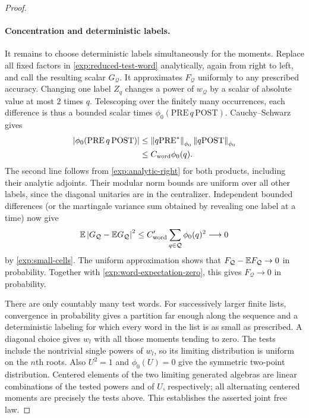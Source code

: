 \begin{proof}
\paragraph{Concentration and deterministic labels.}
It remains to choose deterministic labels simultaneously for the
moments. Replace all fixed factors in
\eqref{exp:reduced-test-word} analytically, again from right to left,
and call the resulting scalar $G_{\mathcal Q}$. It approximates
$F_{\mathcal Q}$ uniformly to any prescribed accuracy. Changing one
label $Z_q$ changes a power of $w_{\mathcal Q}$ by a scalar of
absolute value at most $2$ times $q$. Telescoping over the finitely
many occurrences, each difference is thus a bounded scalar times
$\phi_0(\mathrm{PRE}\,q\,\mathrm{POST})$. Cauchy--Schwarz gives
\begin{align}\label{exp:two-sided-influence}
 \left|\phi_0(\mathrm{PRE}\,q\,\mathrm{POST})\right|
 &\leq\left\lVert q\mathrm{PRE}^*\right\rVert_{\phi_0}
        \left\lVert q\mathrm{POST}\right\rVert_{\phi_0}\notag\\
 &\leq C_{\mathrm{word}}\phi_0(q).
\end{align}
The second line follows from \eqref{exp:analytic-right} for both
products, including their analytic adjoints. Their modular norm
bounds are uniform over all other labels, since the diagonal
unitaries are in the centralizer. Independent bounded differences
(or the martingale variance sum obtained by revealing one label at
a time) now give
\[
 \mathbb E\left|G_{\mathcal Q}-\mathbb E G_{\mathcal Q}\right|^2
 \leq C'_{\mathrm{word}}\sum_{q\in\mathcal Q}\phi_0(q)^2
 \longrightarrow0
\]
by \eqref{exp:small-cells}. The uniform approximation shows that
$F_{\mathcal Q}-\mathbb E F_{\mathcal Q}\to0$ in probability. Together with
\eqref{exp:word-expectation-zero}, this gives
$F_{\mathcal Q}\to0$ in probability.

There are only countably many test words. For successively larger
finite lists, convergence in probability gives a partition far
enough along the sequence and a deterministic labeling for which
every word in the list is as small as prescribed. A diagonal choice
gives $w_l$ with all those moments tending to zero. The tests include
the nontrivial single powers of $w_l$, so its limiting distribution
is uniform on the $n$th roots. Also $U^2=1$ and $\phi_0(U)=0$ give
the symmetric two-point distribution. Centered elements of the two
limiting generated algebras are linear combinations of the tested
powers and of $U$, respectively; all alternating centered moments
are precisely the tests above. This establishes the asserted joint
free law.
\end{proof}

